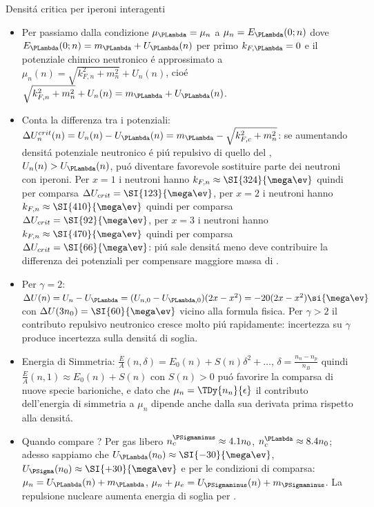 \begin{frame}{Densit\'a critica per iperoni interagenti}
    \begin{itemize}
        \item Per \PLambda passiamo dalla condizione $\mu_{\PLambda}=\mu_n$ a $\mu_n=E_{\PLambda}(0;n)$ dove $E_{\PLambda}(0;n)=m_{\PLambda}+U_{\PLambda}(n)$ per primo \PLambda $k_{F,\PLambda}=0$ e il potenziale chimico neutronico \'e approssimato a $\mu_n(n)=\sqrt{k_{F,n}^2+m_n^2}+U_n(n)$, cio\'e $\sqrt{k_{F,n}^2+m_n^2}+U_n(n)=m_{\PLambda}+U_{\PLambda}(n)$.
        \item Conta la differenza tra i potenziali: $\Delta U_n^{crit}(n)=U_n(n)-U_{\PLambda}(n)=m_{\PLambda}-\sqrt{k_{F,c}^2+m_n^2}$: se aumentando densit\'a potenziale neutronico \'e pi\'u repulsivo di quello del \PLambda, $U_n(n)>U_{\PLambda}(n)$, pu\'o diventare favorevole sostituire parte dei neutroni con iperoni. Per $x=1$ i neutroni hanno $k_{F,n}\approx\SI{324}{\mega\ev}$ quindi per comparsa \PLambda $\Delta U_{crit}=\SI{123}{\mega\ev}$, per $x=2$ i neutroni hanno $k_{F,n}\approx\SI{410}{\mega\ev}$ quindi per comparsa \PLambda $\Delta U_{crit}=\SI{92}{\mega\ev}$, per $x=3$ i neutroni hanno $k_{F,n}\approx\SI{470}{\mega\ev}$ quindi per comparsa \PLambda $\Delta U_{crit}=\SI{66}{\mega\ev}$: pi\'u sale densit\'a meno deve contribuire la differenza dei potenziali per compensare maggiore massa di \PLambda.
        \item Per $\gamma=2$: $\Delta U(n)=U_n-U_{\PLambda}=(U_{n,0}-U_{\PLambda,0})(2x-x^2)=-20(2x-x^2)\si{\mega\ev}$ con $\Delta U(3n_0)=\SI{60}{\mega\ev}$ vicino alla formula fisica. Per $\gamma>2$ il contributo repulsivo neutronico cresce molto pi\'u rapidamente: incertezza su $\gamma$ produce incertezza sulla densit\'a di soglia.
        \item Energia di Simmetria: $\frac{E}{A}(n,\delta)=E_0(n)+S(n)\delta^2+\ldots$, $\delta=\frac{n_n-n_p}{n_B}$ quindi $\frac{E}{A}(n,1)\approx E_0(n)+S(n)$ con $S(n)>0$ pu\'o favorire la comparsa di nuove specie barioniche, e dato che $\mu_n=\TDy{n_n}{\epsilon}$ il contributo dell'energia di simmetria a $\mu_n$ dipende anche dalla sua derivata prima rispetto alla densit\'a.
        \item Quando compare \PSigma? Per gas libero $n_c^{\PSigmaminus}\approx4.1n_0$, $n_c^{\PLambda}\approx8.4n_0$; adesso sappiamo che $U_{\PLambda}(n_0)\approx\SI{-30}{\mega\ev}$, $U_{\PSigma}(n_0)\approx\SI{+30}{\mega\ev}$ e per le condizioni di comparsa: $\mu_n=U_{\PLambda}(n)+m_{\PLambda}$, $\mu_n+\mu_e=U_{\PSigmaminus}(n)+m_{\PSigmaminus}$. La repulsione nucleare aumenta energia di soglia per \PSigmaminus.
    \end{itemize}
\end{frame}

